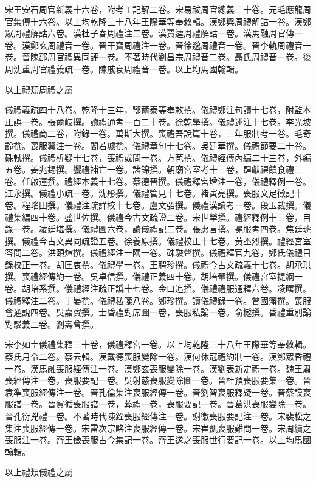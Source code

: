 \begin{pinyinscope}
宋王安石周官新義十六卷，附考工記解二卷。宋易祓周官總義三十卷。元毛應龍周官集傳十六卷。以上均乾隆三十八年王際華等奉敕輯。漢鄭興周禮解詁一卷。漢鄭眾周禮解詁六卷。漢杜子春周禮注二卷。漢賈逵周禮解詁一卷。漢馬融周官傳一卷。漢鄭玄周禮音一卷。晉干寶周禮注一卷。晉徐邈周禮音一卷。晉李軌周禮音一卷。晉陳邵周官禮異同評一卷。不著時代劉昌宗周禮音二卷。聶氏周禮音一卷。後周沈重周官禮義疏一卷。陳戚袞周禮音一卷。以上均馬國翰輯。

以上禮類周禮之屬

儀禮義疏四十八卷。乾隆十三年，鄂爾泰等奉敕撰。儀禮鄭注句讀十七卷，附監本正誤一卷。張爾岐撰。讀禮通考一百二十卷。徐乾學撰。儀禮述注十七卷。李光坡撰。儀禮商二卷，附錄一卷。萬斯大撰。喪禮吾說篇十卷，三年服制考一卷。毛奇齡撰。喪服翼注一卷。閻若璩撰。儀禮章句十七卷。吳廷華撰。儀禮節要二十卷。硃軾撰。儀禮析疑十七卷，喪禮或問一卷。方苞撰。儀禮經傳內編二十三卷，外編五卷。姜兆錫撰。饗禮補亡一卷。諸錦撰。朝廟宮室考十三卷，肆獻祼饋食禮三卷。任啟運撰。禮經本義十七卷。蔡德晉撰。儀禮釋宮增注一卷，儀禮釋例一卷。江永撰。儀禮小疏一卷。沈彤撰。儀禮管見十七卷。褚寅亮撰。喪服文足徵記十卷。程瑤田撰。儀禮注疏詳校十七卷。盧文弨撰。儀禮漢讀考一卷。段玉裁撰。儀禮集編四十卷。盛世佐撰。儀禮今古文疏證二卷。宋世犖撰。禮經釋例十三卷，目錄一卷。凌廷堪撰。儀禮圖六卷，讀儀禮記二卷。張惠言撰。冕服考四卷。焦廷琥撰。儀禮今古文異同疏證五卷。徐養原撰。儀禮校正十七卷。黃丕烈撰。禮經宮室答問二卷。洪頤煊撰。儀禮經注一隅一卷。硃駿聲撰。儀禮釋官九卷，鄭氏儀禮目錄校正一卷。胡匡衷撰。儀禮學一卷。王聘珍撰。儀禮今古文疏義十七卷。胡承珙撰。喪禮經傳約一卷。吳卓信撰。儀禮正義四十卷。胡培翬撰。儀禮宮室提綱一卷。胡培系撰。儀禮經注疏正譌十七卷。金曰追撰。儀禮禮服通釋六卷。凌曙撰。儀禮釋注二卷。丁晏撰。儀禮私箋八卷。鄭珍撰。讀儀禮錄一卷。曾國籓撰。喪服會通說四卷。吳嘉賓撰。士昏禮對席圖一卷，喪服私論一卷。俞樾撰。昏禮重別論對駁義二卷。劉壽曾撰。

宋李如圭儀禮集釋三十卷，儀禮釋宮一卷。以上均乾隆三十八年王際華等奉敕輯。蔡氏月令二卷。蔡云輯。漢戴德喪服變除一卷。漢何休冠禮約制一卷。漢鄭眾昏禮一卷。漢馬融喪服經傳注一卷。漢鄭玄喪服變除一卷。漢劉表新定禮一卷。魏王肅喪經傳注一卷，喪服要記一卷。吳射慈喪服變除圖一卷。晉杜預喪服要集一卷。晉袁準喪服經傳注一卷。晉孔倫集注喪服經傳一卷。晉劉智喪服釋疑一卷。晉蔡謨喪服譜一卷。晉賀循喪服譜一卷，葬禮一卷，喪服要記一卷。晉葛洪喪服變除一卷。晉孔衍兇禮一卷。不著時代陳銓喪服經傳注一卷。謝徽喪服要記注一卷。宋裴松之集注喪服經傳一卷。宋雷次宗略注喪服經傳一卷。宋崔凱喪服難問一卷。宋周續之喪服注一卷。齊王儉喪服古今集記一卷。齊王逡之喪服世行要記一卷。以上均馬國翰輯。

以上禮類儀禮之屬


\end{pinyinscope}
